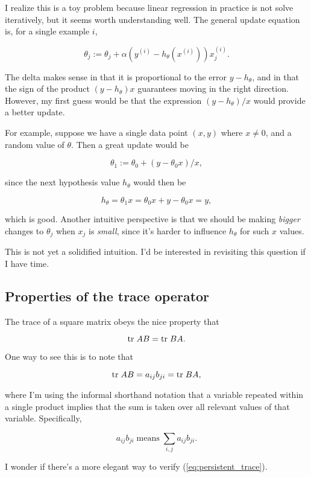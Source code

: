 \documentclass[]{article}
\begin{document}
I realize this is a toy problem because linear regression in practice is
not solve iteratively, but it seems worth understanding well. The
general update equation is, for a single example \(i\),

\[\theta_j := \theta_j + \alpha(y^{(i)} - h_\theta(x^{(i)}))x_j^{(i)}.\]

The delta makes sense in that it is proportional to the error
\(y-h_\theta\), and in that the sign of the product \((y-h_\theta)x\)
guarantees moving in the right direction. However, my first guess would
be that the expression \((y-h_\theta)/x\) would provide a better update.

For example, suppose we have a single data point \((x, y)\) where
\(x\ne 0\), and a random value of \(\theta\). Then a great update would
be

\[\theta_1 := \theta_0 + (y - \theta_0 x)/x,\]

since the next hypothesis value \(h_\theta\) would then be

\[h_\theta = \theta_1 x = \theta_0 x + y - \theta_0x = y,\]

which is good. Another intuitive perspective is that we should be making
\emph{bigger} changes to \(\theta_j\) when \(x_j\) is \emph{small},
since it's harder to influence \(h_\theta\) for such \(x\) values.

This is not yet a solidified intuition. I'd be interested in revisiting
this question if I have time.

\subsection{Properties of the trace
operator}\label{properties-of-the-trace-operator}

The trace of a square matrix obeys the nice property that

\begin{equation}\text{tr}\; AB = \text{tr}\; BA.\label{eq:persistent_trace}\end{equation}

One way to see this is to note that

\[\text{tr}\; AB = a_{ij}b_{ji} = \text{tr}\; BA,\]

where I'm using the informal shorthand notation that a variable repeated
within a single product implies that the sum is taken over all relevant
values of that variable. Specifically,

\[a_{ij}b_{ji} \;\text{means}\; \sum_{i,j} a_{ij}b_{ji}.\]

I wonder if there's a more elegant way to verify
(\ref{eq:persistent_trace}).
\end{document}
